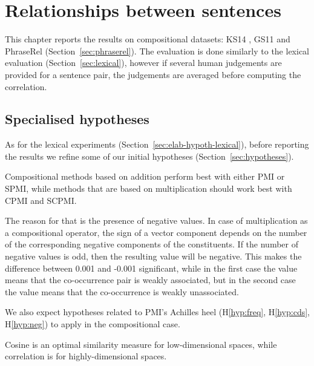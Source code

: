\chapter{Relationships between sentences}
\label{sec:sentential}

This chapter reports the results on compositional datasets: KS14 \cite{kartsadrqpl2014}, GS11 \cite{Grefenstette:2011:ETV:2140490.2140497} and PhraseRel (Section~\ref{sec:phraserel}). The evaluation is done similarly to the lexical evaluation (Section~\ref{sec:lexical}), however if several human judgements are provided for a sentence pair, the judgements are averaged before computing the correlation.

\section{Specialised hypotheses}
\label{sec:elab-hypoth-comp}

As for the lexical experiments (Section~\ref{sec:elab-hypoth-lexical}), before reporting the results we refine some of our initial hypotheses (Section~\ref{sec:hypotheses}).

\begin{hyp}
  \label{hyp:comp-pmi-cpmi}
  Compositional methods based on addition perform best with either PMI or SPMI, while methods that are based on multiplication should work best with CPMI and SCPMI.
\end{hyp}

The reason for that is the presence of negative values. In case of multiplication as a compositional operator, the sign of a vector component depends on the number of the corresponding negative components of the constituents. If the number of negative values is odd, then the resulting value will be negative. This makes the difference between 0.001 and -0.001 significant, while in the first case the value means that the co-occurrence pair is weakly associated, but in the second case the value means that the co-occurrence is weakly unassociated.

We also expect hypotheses related to PMI's Achilles heel (H\ref{hyp:freq}, H\ref{hyp:cds}, H\ref{hyp:neg}) to apply in the compositional case.

\begin{hyp}
  \label{hyp:similarity}
  Cosine is an optimal similarity measure for low-dimensional spaces, while correlation is for highly-dimensional spaces.
\end{hyp}

